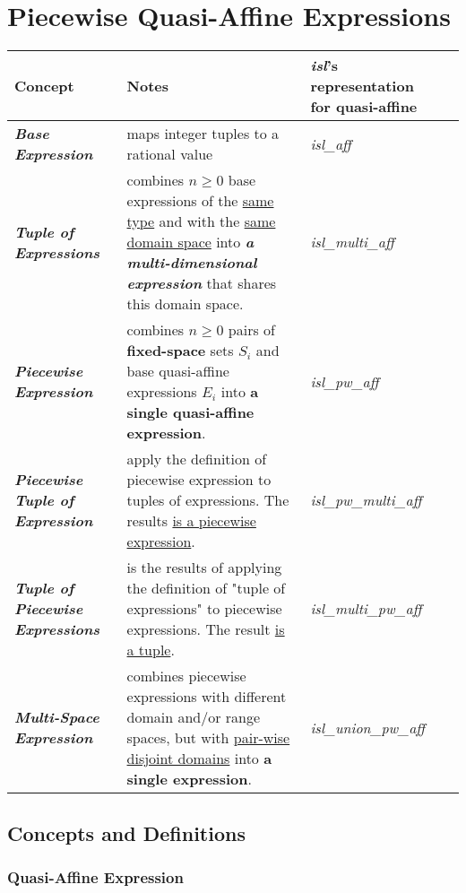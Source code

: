 \section{Piecewise Quasi-Affine Expressions}

\begin{tabular}{lp{7cm}p{3cm}p{3cm}}
\toprule
\textbf{Concept} & \textbf{Notes} & \textbf{\emph{isl}'s representation for quasi-affine} \\
\midrule
\textbf{\textit{Base Expression}} &
maps integer tuples to a rational value &
\textcolor{pg}{\emph{isl\_aff}} \\
\textbf{\textit{Tuple of Expressions}} &
combines $n \ge 0$ base expressions of the \underline{same type} and with the \underline{same domain space} into \textbf{\textit{a multi-dimensional expression}} that shares this domain space. &
\textcolor{pg}{\emph{isl\_multi\_aff}} \\
\textbf{\textit{Piecewise Expression}} &
combines $n \ge 0$ pairs of \textbf{fixed-space} sets $S_i$ and base quasi-affine expressions $E_i$ into \textbf{a single quasi-affine expression}. &
\textcolor{pg}{\emph{isl\_pw\_aff}} \\
\textbf{\textit{Piecewise Tuple of Expression}} &
apply the definition of piecewise expression to tuples of expressions. The results \underline{is a piecewise expression}. & \textcolor{pg}{\emph{isl\_pw\_multi\_aff}} \\
\textbf{\textit{Tuple of Piecewise Expressions}} &
is the results of applying the definition of "tuple of expressions" to piecewise expressions. The result \underline{is a tuple}.&
\textcolor{pg}{\emph{isl\_multi\_pw\_aff}} \\
\textbf{\textit{Multi-Space Expression}} & combines piecewise expressions with different domain and/or range spaces, but with \underline{pair-wise disjoint domains} into \textbf{a single expression}. &
\textcolor{pg}{\emph{isl\_union\_pw\_aff}}  \\

\bottomrule
\end{tabular}

\subsection{Concepts and Definitions}

\subsubsection{Quasi-Affine Expression}

